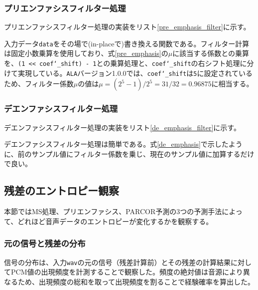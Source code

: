 \documentclass[uplatex,dvipdfmx,b5j,10pt]{jsbook}
\theoremstyle{definition}
\begin{document}
\subsubsection{プリエンファシスフィルター処理}

プリエンファシスフィルター処理の実装をリスト\ref{pre_emphasis_filter}に示す。


入力データ\texttt{data}をその場で(in-placeで)書き換える関数である。フィルター計算は固定小数乗算を使用しており、式\ref{pre_emphasis}の$\mu$に該当する係数との乗算を、\texttt{(1 << coef\char`_shift) - 1}との乗算処理と、\texttt{coef\char`_shift}の右シフト処理に分けて実現している。\texttt{ALA}バージョン1.0.0では、\texttt{coef\char`_shift}は\texttt{5}に設定されているため、フィルター係数$\mu$の値は$\mu = (2^{5} - 1) / 2^{5} = 31 / 32 = 0.96875$に相当する。

\subsubsection{デエンファシスフィルター処理}

デエンファシスフィルター処理の実装をリスト\ref{de_emphasis_filter}に示す。


デエンファシスフィルター処理は簡単である。式\ref{de_emphasis}で示したように、前のサンプル値にフィルター係数を乗じ、現在のサンプル値に加算するだけで良い。

\subsection{残差のエントロピー観察}

本節ではMS処理、プリエンファシス、PARCOR予測の3つの予測手法によって、どれほど音声データのエントロピーが変化するかを観察する。

\subsubsection{元の信号と残差の分布}

信号の分布は、入力\texttt{wav}の元の信号（残差計算前）とその残差の計算結果に対してPCM値の出現頻度を計測することで観察した。頻度の絶対値は音源により異なるため、出現頻度の総和を取って出現頻度を割ることで経験確率を算出した。
\end{document}
